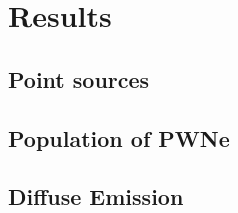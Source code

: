 \documentclass[main.tex]{subfiles}
\begin{document}
\section{Results}\label{sec:results}
        
\subsection{Point sources}
\subsection{Population of PWNe}
\subsection{Diffuse Emission}
        
\end{document}
